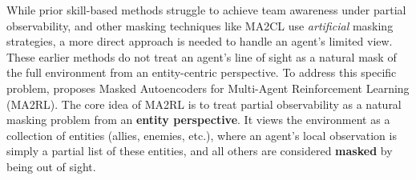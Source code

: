 

While prior skill-based methods struggle to achieve team awareness under partial observability, and other masking techniques like MA2CL use \textit{artificial} masking strategies, a more direct approach is needed to handle an agent's limited view. These earlier methods do not treat an agent's line of sight as a natural mask of the full environment from an entity-centric perspective. To address this specific problem, \parencite{ma2rl} proposes Masked Autoencoders for Multi-Agent Reinforcement Learning (MA2RL). The core idea of MA2RL is to treat partial observability as a natural masking problem from an \textbf{entity perspective}. It views the environment as a collection of entities (allies, enemies, etc.), where an agent's local observation is simply a partial list of these entities, and all others are considered \textbf{masked} by being out of sight.

